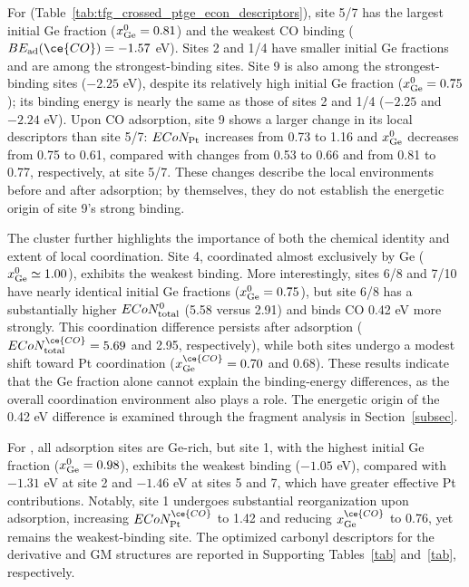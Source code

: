 For  (Table~\ref{tab:tfg_crossed_ptge_econ_descriptors}), site 5/7 has the largest initial Ge fraction ($x_{\rm Ge}^{0}=0.81$) and the weakest CO binding ($BE_{\rm ad}(\ce{CO})=-1.57$ eV). Sites 2 and 1/4 have smaller initial Ge fractions and are among the strongest-binding sites. Site 9 is also among the strongest-binding sites ($-2.25$ eV), despite its relatively high initial Ge fraction ($x_{\rm Ge}^{0}=0.75$); its binding energy is nearly the same as those of sites 2 and 1/4 ($-2.25$ and $-2.24$ eV). Upon CO adsorption, site 9 shows a larger change in its local descriptors than site 5/7: $ECoN_{\rm Pt}$ increases from 0.73 to 1.16 and $x^0_{\rm Ge}$ decreases from 0.75 to 0.61, compared with changes from 0.53 to 0.66 and from 0.81 to 0.77, respectively, at site 5/7. These changes describe the local environments before and after adsorption; by themselves, they do not establish the energetic origin of site 9's strong binding.

The  cluster further highlights the importance of both the chemical identity and extent of local coordination. Site 4, coordinated almost exclusively by Ge ($x_{\rm Ge}^{0}\simeq1.00$), exhibits the weakest binding. More interestingly, sites 6/8 and 7/10 have nearly identical initial Ge fractions ($x_{\rm Ge}^{0}=0.75$), but site 6/8 has a substantially higher $ECoN_{\rm total}^{0}$ (5.58 versus 2.91) and binds CO 0.42 eV more strongly. This coordination difference persists after adsorption ($ECoN_{\rm total}^{\ce{CO}}=5.69$ and 2.95, respectively), while both sites undergo a modest shift toward Pt coordination ($x_{\rm Ge}^{\ce{CO}}=0.70$ and 0.68). These results indicate that the Ge fraction alone cannot explain the binding-energy differences, as the overall coordination environment also plays a role. The energetic origin of the 0.42 eV difference is examined through the fragment analysis in Section~\ref{subsec}.

For , all adsorption sites are Ge-rich, but site 1, with the highest initial Ge fraction ($x_{\rm Ge}^{0}=0.98$), exhibits the weakest binding ($-1.05$ eV), compared with $-1.31$ eV at site 2 and $-1.46$ eV at sites 5 and 7, which have greater effective Pt contributions. Notably, site 1 undergoes substantial reorganization upon adsorption, increasing {$ECoN_{\rm Pt}^{\ce{CO}}$} to 1.42 and reducing {$x_{\rm Ge}^{\ce{CO}}$} to 0.76, yet remains the weakest-binding site. The optimized carbonyl descriptors for the derivative and GM structures are reported in Supporting Tables~\ref{tab} and~\ref{tab}, respectively.

